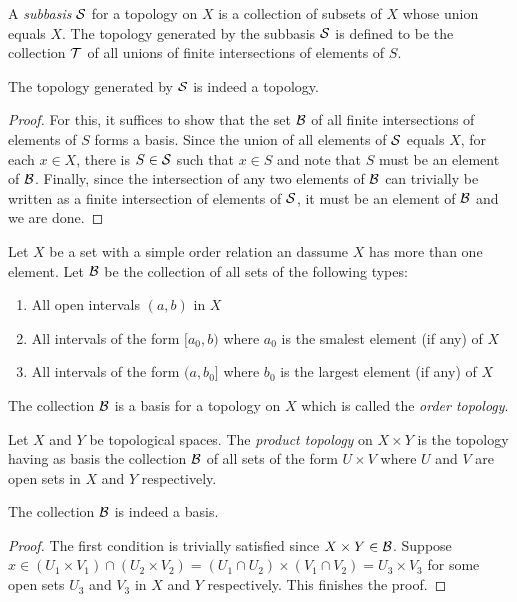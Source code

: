 \begin{definition}[Subbasis]
    A \textit{subbasis} $\S$ for a topology on $X$ is a collection of subsets of $X$ whose union equals $X$. The topology generated by the subbasis $\S$ is defined to be the collection $\T$ of all unions of finite intersections of elements of $S$.
\end{definition}

\begin{proposition}
    The topology generated by $\S$ is indeed a topology.
\end{proposition}
\begin{proof}
    For this, it suffices to show that the set $\B$ of all finite intersections of elements of $S$ forms a basis. Since the union of all elements of $\S$ equals $X$, for each $x\in X$, there is $S\in\S$ such that $x\in S$ and note that $S$ must be an element of $\B$. Finally, since the intersection of any two elements of $\B$ can trivially be written as a finite intersection of elements of $\S$, it must be an element of $\B$ and we are done.
\end{proof}

\begin{definition}
    Let $X$ be a set with a simple order relation an dassume $X$ has more than one element. Let $\B$ be the collection of all sets of the following types: 
    \begin{enumerate}
        \item All open intervals $(a,b)$ in $X$
        \item All intervals of the form $[a_0,b)$ where $a_0$ is the smalest element (if any) of $X$ 
        \item All intervals of the form $(a,b_0]$ where $b_0$ is the largest element (if any) of $X$
    \end{enumerate}
    The collection $\B$ is a basis for a topology on $X$ which is called the \textit{order topology}.
\end{definition}

\begin{definition}
    Let $X$ and $Y$ be topological spaces. The \textit{product topology} on $X\times Y$ is the topology having as basis the collection $\B$ of all sets of the form $U\times V$ where $U$ and $V$ are open sets in $X$ and $Y$ respectively.
\end{definition}

\begin{proposition}
    The collection $\B$ is indeed a basis.
\end{proposition}
\begin{proof}
    The first condition is trivially satisfied since $X\times Y\in\B$. Suppose $x\in (U_1\times V_1)\cap(U_2\times V_2) = (U_1\cap U_2)\times(V_1\cap V_2) = U_3\times V_3$ for some open sets $U_3$ and $V_3$ in $X$ and $Y$ respectively. This finishes the proof.
\end{proof}

